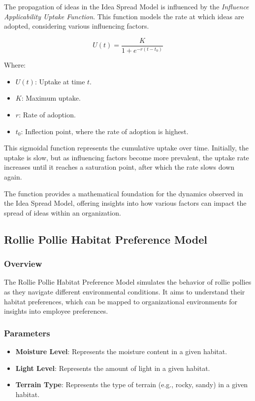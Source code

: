 \documentclass[sn-nature]{sn-jnl}%
\theoremstyle{thmstyleone}%
\theoremstyle{thmstyletwo}%
\theoremstyle{thmstylethree}%
\begin{document}
The propagation of ideas in the Idea Spread Model is influenced by the \textit{Influence Applicability Uptake Function}\cite{rischling_influence_2023}. This function models the rate at which ideas are adopted, considering various influencing factors.

\begin{equation}
U(t) = \frac{K}{1 + e^{-r(t-t_0)}}
\end{equation}

Where:
\begin{itemize}
    \item \( U(t) \): Uptake at time \( t \).
    \item \( K \): Maximum uptake.
    \item \( r \): Rate of adoption.
    \item \( t_0 \): Inflection point, where the rate of adoption is highest.
\end{itemize}

This sigmoidal function represents the cumulative uptake over time. Initially, the uptake is slow, but as influencing factors become more prevalent, the uptake rate increases until it reaches a saturation point, after which the rate slows down again. 

The function provides a mathematical foundation for the dynamics observed in the Idea Spread Model, offering insights into how various factors can impact the spread of ideas within an organization.

\subsection{Rollie Pollie Habitat Preference Model}

\subsubsection{Overview}
The Rollie Pollie Habitat Preference Model simulates the behavior of rollie pollies as they navigate different environmental conditions. It aims to understand their habitat preferences, which can be mapped to organizational environments for insights into employee preferences.

\subsubsection{Parameters}
\begin{itemize}
    \item \textbf{Moisture Level}: Represents the moisture content in a given habitat.
    \item \textbf{Light Level}: Represents the amount of light in a given habitat.
    \item \textbf{Terrain Type}: Represents the type of terrain (e.g., rocky, sandy) in a given habitat.
\end{itemize}
\end{document}
